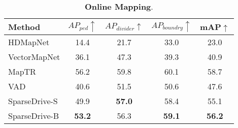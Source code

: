 \begin{table}[htbp]
\centering
\scalebox{0.8}
{
\begin{tabular}{l|ccc|c}
\toprule
Method & $AP_{ped}\uparrow$ & $AP_{divider}\uparrow$ & $AP_{boundry}\uparrow$ & \cellcolor{gray!30}mAP$\uparrow$ \\
\midrule
HDMapNet & 14.4 & 21.7 & 33.0 & \cellcolor{gray!30}23.0 \\
VectorMapNet & 36.1 & 47.3 & 39.3 & \cellcolor{gray!30}40.9 \\
MapTR & 56.2 & 59.8 & 60.1 & \cellcolor{gray!30}58.7 \\
\midrule
VAD & 40.6 & 51.5 & 50.6 & \cellcolor{gray!30}47.6 \\
SparseDrive-S & 49.9 & \textbf{57.0} & 58.4 & \cellcolor{gray!30}55.1 \\
SparseDrive-B & \textbf{53.2} & 56.3 & \textbf{59.1} & \cellcolor{gray!30}\textbf{56.2} \\
\bottomrule
\end{tabular}
}
\vspace{5pt}
\caption{\textbf{Online Mapping}.}
\label{tab:mapping}
\end{table} 